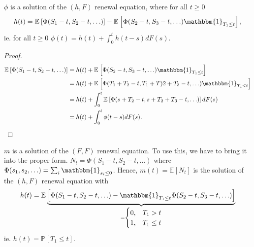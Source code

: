 \begin{prop}[]
	$\phi$ is a solution of the $ (h,F)$ renewal equation, where for all $t\geq 0$
	\begin{align}
		h(t) = \mathbb{E}_{} \left[ \Phi(S_1 -t, S_2-t, \ldots) \right] - \mathbb{E}_{} \left[ \Phi(S_2 - t, S_3-t, \ldots)\mathbbm{1}_{T_1\leq t}  \right] ,	
	\end{align}
	ie. for all $t\geq 0$ $\phi(t) = h(t) + \int_{0}^{t} h(t-s)dF(s)$.
\end{prop}

\begin{proof}
	\begin{align}
		\mathbb{E}_{} \left[ \Phi(S_1 - t, S_2-t, \ldots) \right] 
		&= h(t) + \mathbb{E}_{} \left[ \Phi(S_2 -t, S_3-t,\ldots)\mathbbm{1}_{T_1 \leq t}  \right] \\
		&= h(t) + \mathbb{E}_{} \left[ \Phi(T_1 + T_2 - t, T_1+T)2 + T_3 -t, \ldots)\mathbbm{1}_{T_1\leq t}\right] \\ 
		&= h(t) + \int_{0}^{t} \mathbb{E}_{} \left[ \Phi(s+T_2 -t, s+T_2+T_3-t,\ldots) \right] dF(s) \\
		&= h(t) + \int_{0}^{t} \phi(t-s)dF(s).
	\end{align}
\end{proof}

\begin{ex}[Application 1]
	$m$ is a solution of the $(F,F)$ renewal equation. {\color{blue}To use this, we have to bring it into the proper form.} $N_t = \Phi(S_1-t, S_2-t,\ldots)$ where $\Phi(s_1,s_2,\ldots) = \sum_{i}^{} \mathbbm{1}_{s_i\leq 0} $. Hence, $m(t) = \mathbb{E}_{} \left[ N_t \right]$ is the solution of the $(h,F)$ renewal equation with
	\begin{align}
		h(t) = \mathbb{E}_{} \underbrace{\left[ \Phi(S_1-t, S_2-t,\ldots) - \mathbbm{1}_{T_1\leq t} \Phi(S_2-t, S_3-t, \ldots)  \right]}_{=
	\begin{cases}
		0, &T_1>t \\
		1, &T_1\leq t
	\end{cases}
}
	\end{align}
	ie. $h(t) = \mathbb{P}_{} \left[ T_1 \leq t \right] $.	
\end{ex}

